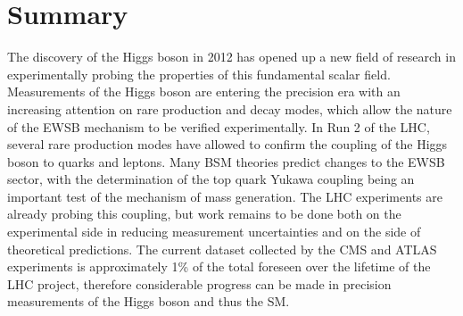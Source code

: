 \section{Summary}
The discovery of the Higgs boson in 2012 has opened up a new field of research in experimentally probing the properties of this fundamental scalar field. Measurements of the Higgs boson are entering the precision era with an increasing attention on rare production and decay modes, which allow the nature of the EWSB mechanism to be verified experimentally. In Run 2 of the LHC, several rare production modes have allowed to confirm the coupling of the Higgs boson to quarks and leptons. Many BSM theories predict changes to the EWSB sector, with the determination of the top quark Yukawa coupling being an important test of the mechanism of mass generation. The LHC experiments are already probing this coupling, but work remains to be done both on the experimental side in reducing measurement uncertainties and on the side of theoretical predictions. The current dataset collected by the CMS and ATLAS experiments is approximately 1\% of the total foreseen over the lifetime of the LHC project, therefore considerable progress can be made in precision measurements of the Higgs boson and thus the SM.